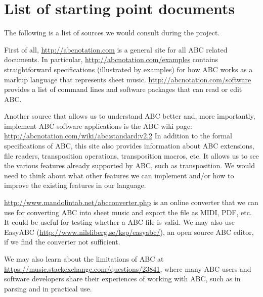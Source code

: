 \section{List of starting point documents}
The following is a list of sources we would consult during the project. 

First of all, \url{http://abcnotation.com} is a general site for all ABC related documents. In particular, \url{http://abcnotation.com/examples} contains straightforward specifications (illustrated by examples) for how ABC works as a markup language that represents sheet music. \url{http://abcnotation.com/software} provides a list of command lines and software packages that can read or edit ABC. 

Another source that allows us to understand ABC better and, more importantly, implement ABC software applications is the ABC wiki page: \url{http://abcnotation.com/wiki/abc:standard:v2.2} In addition to the formal specifications of ABC, this site also provides information about ABC extensions, file readers, transposition operations, transposition macros, etc. It allows us to see the various features already supported by ABC, such as transposition. We would need to think about what other features we can implement and/or how to improve the existing features in our language.

\url{http://www.mandolintab.net/abcconverter.php} is an online converter that we can use for converting ABC into sheet music and export the file as MIDI, PDF, etc. It could be useful for testing whether a ABC file is valid. We may also use EasyABC (\url{http://www.nilsliberg.se/ksp/easyabc/}), an open source ABC editor, if we find the converter not sufficient.

We may also learn about the limitations of ABC at \url{https://music.stackexchange.com/questions/23841}, where many ABC users and software developers share their experiences of working with ABC, such as in parsing and in practical use.
